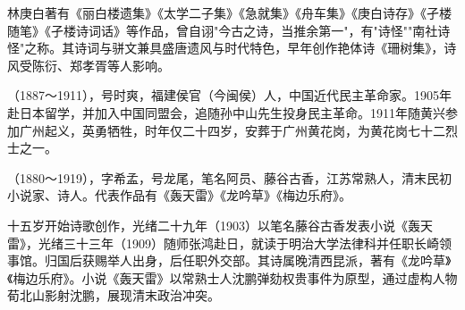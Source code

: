 \begin{description}
        林庚白著有《丽白楼遗集》《太学二子集》《急就集》《舟车集》《庚白诗存》《孑楼随笔》《孑楼诗词话》等作品，曾自诩"今古之诗，当推余第一"，有"诗怪""南社诗怪"之称。其诗词与骈文兼具盛唐遗风与时代特色，早年创作艳体诗《珊树集》，诗风受陈衍、郑孝胥等人影响。
  \item[林文] （1887～1911），号时爽，福建侯官（今闽侯）人，中国近代民主革命家。1905年赴日本留学，并加入中国同盟会，追随孙中山先生投身民主革命。1911年随黄兴参加广州起义，英勇牺牲，时年仅二十四岁，安葬于广州黄花岗，为黄花岗七十二烈士之一。
  \item[孙景贤] （1880～1919），字希孟，号龙尾，笔名阿员、藤谷古香，江苏常熟人，清末民初小说家、诗人。代表作品有《轰天雷》《龙吟草》《梅边乐府》。\par
        十五岁开始诗歌创作，光绪二十九年（1903）以笔名藤谷古香发表小说《轰天雷》，光绪三十三年（1909）随师张鸿赴日，就读于明治大学法律科并任职长崎领事馆。归国后获赐举人出身，后任职外交部。其诗属晚清西昆派，著有《龙吟草》《梅边乐府》。小说《轰天雷》以常熟士人沈鹏弹劾权贵事件为原型，通过虚构人物荀北山影射沈鹏，展现清末政治冲突。
\end{description}



